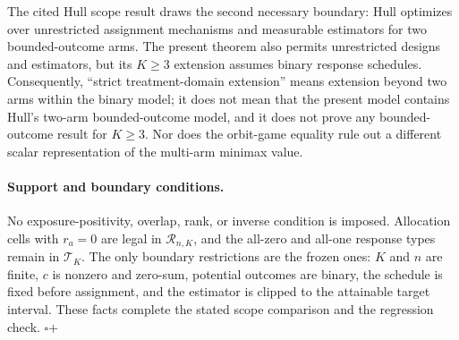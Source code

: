 The cited Hull scope result draws the second necessary boundary: Hull optimizes over unrestricted assignment mechanisms and measurable estimators for two bounded-outcome arms.  The present theorem also permits unrestricted designs and estimators, but its \(K\geq3\) extension assumes binary response schedules.  Consequently, ``strict treatment-domain extension'' means extension beyond two arms within the binary model; it does not mean that the present model contains Hull's two-arm bounded-outcome model, and it does not prove any bounded-outcome result for \(K\geq3\).  Nor does the orbit-game equality rule out a different scalar representation of the multi-arm minimax value.

\paragraph{Support and boundary conditions.}
No exposure-positivity, overlap, rank, or inverse condition is imposed.  Allocation cells with \(r_a=0\) are legal in \(\mathcal R_{n,K}\), and the all-zero and all-one response types remain in \(\mathcal T_K\).  The only boundary restrictions are the frozen ones: \(K\) and \(n\) are finite, \(c\) is nonzero and zero-sum, potential outcomes are binary, the schedule is fixed before assignment, and the estimator is clipped to the attainable target interval.  These facts complete the stated scope comparison and the regression check. \(\square\)+